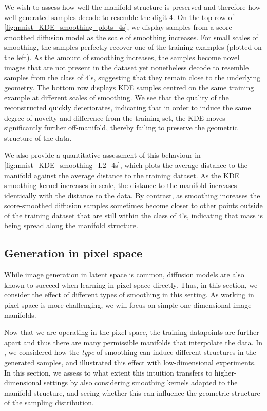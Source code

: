 \documentclass[10pt]{article}
\theoremstyle{plain}
\theoremstyle{definition}
\theoremstyle{remark}
\begin{document}
We wish to assess how well the manifold structure is preserved and therefore how well generated samples decode to resemble the digit \(4\).
On the top row of \cref{fig:mnist_KDE_smoothing_plots_4s}, we display samples from a score-smoothed diffusion model as the scale of smoothing increases. For small scales of smoothing, the samples perfectly recover one of the training examples (plotted on the left). As the amount of smoothing increases, the samples become novel images that are not present in the dataset yet nonetheless decode to resemble samples from the class of \(4\)'s, suggesting that they remain close to the underlying geometry. The bottom row displays KDE samples centred on the same training example at different scales of smoothing. We see that the quality of the reconstructed quickly deteriorates, indicating that in order to induce the same degree of novelty and difference from the training set, the KDE moves significantly further off-manifold, thereby failing to preserve the geometric structure of the data.

We also provide a quantitative assessment of this behaviour in \cref{fig:mnist_KDE_smoothing_L2_4s}, which plots the average distance to the manifold against the average distance to the training dataset. As the KDE smoothing kernel increases in scale, the distance to the manifold increases identically with the distance to the data. By contrast, as smoothing increases the score-smoothed diffusion samples sometimes become closer to other points outside of the training dataset that are still within the class of \(4\)'s, indicating that mass is being spread along the manifold structure.






\subsection{Generation in pixel space}



While image generation in latent space is common, diffusion models are also known to succeed when learning in pixel space directly. Thus, in this section, we consider the effect of different types of smoothing in this setting. As working in pixel space is more challenging, we will focus on simple one-dimensional image manifolds.



Now that we are operating in the pixel space, the training datapoints are further apart and thus there are many permissible manifolds that interpolate the data. In , we considered how the \textit{type} of smoothing can induce different structures in the generated samples, and illustrated this effect with low-dimensional experiments. In this section, we assess to what extent this intuition transfers to higher-dimensional settings by also considering smoothing kernels adapted to the manifold structure, and seeing whether this can influence the geometric structure of the sampling distribution.
\end{document}

